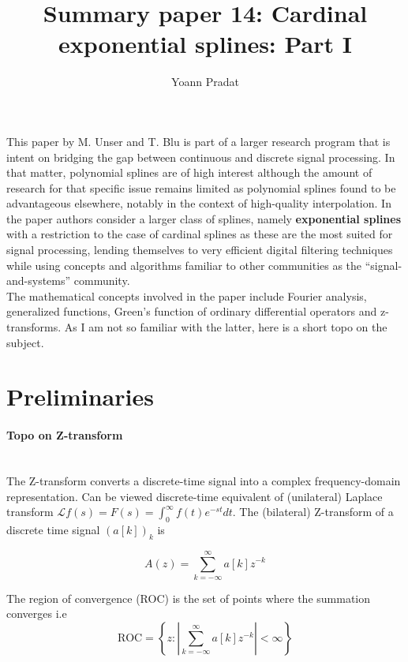 \documentclass[a4paper, 11pt]{article}
\begin{document}
\title{Summary paper 14: Cardinal exponential splines: Part I}
\author{Yoann Pradat}
\maketitle

This paper by M. Unser and T. Blu is part of a larger research program that is intent on bridging the gap between 
continuous and discrete signal processing. In that matter, polynomial splines are of high interest although the amount 
of research for that specific issue remains limited as polynomial splines found to be advantageous elsewhere, notably in 
the context of high-quality interpolation. In the paper authors consider a larger class of splines, namely 
\textbf{exponential splines} with a restriction to the case of cardinal splines as these are the most suited for signal 
processing, lending themselves to very efficient digital filtering techniques while using concepts and algorithms 
familiar to other communities as the “signal-and-systems” community. \\

The mathematical concepts involved in the paper include Fourier analysis, generalized functions, Green's function of 
ordinary differential operators and z-transforms. As I am not so familiar with the latter, here is a short topo on the 
subject.

\section{Preliminaries}

\paragraph{Topo on Z-transform} \mbox{} \\

The Z-transform converts a discrete-time signal into a complex frequency-domain representation. Can be viewed 
discrete-time equivalent of (unilateral) Laplace transform $\mathcal{L}{f}(s) = F(s) = \int_{0}^{\infty} f(t)e^{-st}dt$.
The (bilateral) Z-transform of a discrete time signal ${(a[k])}_k$ is

\begin{equation*}
  A(z) = \sum_{k=-\infty}^{\infty} a[k]z^{-k}
\end{equation*}

The region of convergence (ROC) is the set of points where the summation converges i.e
\begin{equation*}
  \text{ROC} = \left\{z: \left| \sum_{k=-\infty}^{\infty} a[k]z^{-k} \right| < \infty \right\}
\end{equation*}
\end{document}
